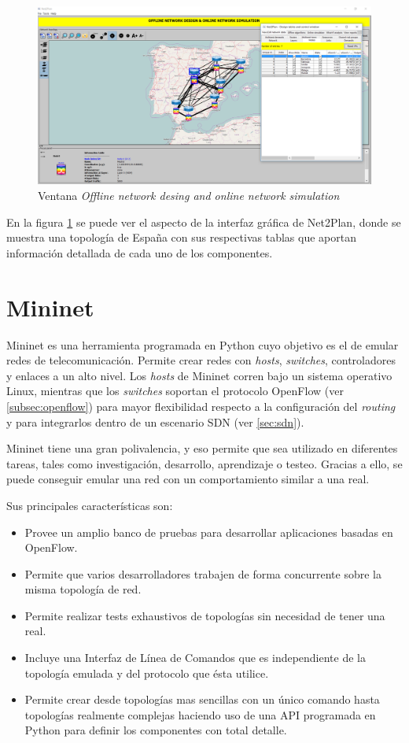 \begin{figure}[ht!]
	\centering
	\includegraphics[width=1\linewidth]{imagenes/n2p_redes}
	\caption{Ventana \textit{Offline network desing and online network simulation}}
	\label{fig:n2p_redes}
\end{figure}

En la figura \ref{fig:n2p_redes} se puede ver el aspecto de la interfaz gráfica de Net2Plan, donde se muestra una topología de España con sus respectivas tablas que aportan información detallada de cada uno de los componentes.

\section{Mininet}
\label{sec:mininet}

Mininet\cite{mininetbib} es una herramienta programada en Python cuyo objetivo es el de emular redes de telecomunicación. Permite crear redes con \textit{hosts}, \textit{switches}, controladores y enlaces a un alto nivel. Los \textit{hosts} de Mininet corren bajo un sistema operativo Linux, mientras que los \textit{switches} soportan el protocolo OpenFlow (ver \ref{subsec:openflow}) para mayor flexibilidad respecto a la configuración del \textit{routing} y para integrarlos dentro de un escenario SDN (ver \ref{sec:sdn}).

Mininet tiene una gran polivalencia, y eso permite que sea utilizado en diferentes tareas, tales como investigación, desarrollo, aprendizaje o testeo. Gracias a ello, se puede conseguir emular una red con un comportamiento similar a una real.

Sus principales características son:
\begin{itemize}
	\item Provee un amplio banco de pruebas para desarrollar aplicaciones basadas en OpenFlow.
	\item Permite que varios desarrolladores trabajen de forma concurrente sobre la misma topología de red.
	\item Permite realizar tests exhaustivos de topologías sin necesidad de tener una real.
	\item Incluye una Interfaz de Línea de Comandos que es independiente de la topología emulada y del protocolo que ésta utilice.
	\item Permite crear desde topologías mas sencillas con un único comando hasta topologías realmente complejas haciendo uso de una API programada en Python para definir los componentes con total detalle.
\end{itemize}


